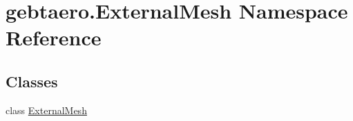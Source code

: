 \hypertarget{namespacegebtaero_1_1_external_mesh}{}\section{gebtaero.\+External\+Mesh Namespace Reference}
\label{namespacegebtaero_1_1_external_mesh}
\subsection*{Classes}
\begin{DoxyCompactItemize}
\item 
class \hyperlink{classgebtaero_1_1_external_mesh_1_1_external_mesh}{External\+Mesh}
\end{DoxyCompactItemize}
